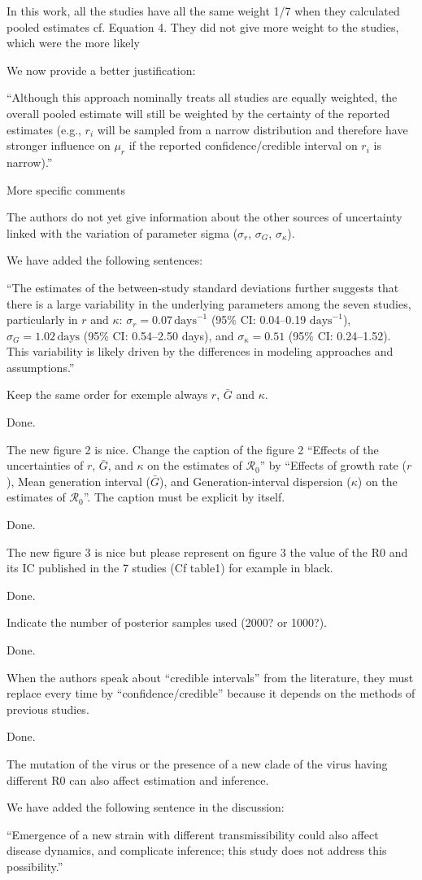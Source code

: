 \documentclass[12pt]{article}
\newcommand{\Ro}{\ensuremath{{\mathcal R}_{0}}\xspace}
\newcommand{\revtext}{\textsf}
\begin{document}
\revtext{In this work, all the studies have all the same weight 1/7 when they calculated pooled estimates
cf. Equation 4. They did not give more weight to the studies, which were the more likely}

We now provide a better justification:

``Although this approach nominally treats all studies are equally weighted, the overall pooled estimate will still be weighted by the certainty of the reported estimates (e.g., $r_i$ will be sampled from a narrow distribution and therefore have stronger influence on $\mu_r$ if the reported confidence/credible interval on $r_i$ is narrow).''

\revtext{More specific comments}

\revtext{The authors do not yet give information about the other sources of uncertainty linked
with the variation of parameter sigma ($\sigma_r$, $\sigma_G$, $\sigma_\kappa$).}

We have added the following sentences:

``The estimates of the between-study standard deviations further suggests that there is a large variability in the underlying parameters among the seven studies, particularly in $r$ and $\kappa$:
$\sigma_r = 0.07\,\textrm{days}^{-1}$ (95\% CI: 0.04--0.19 $\textrm{days}^{-1}$),
$\sigma_G = 1.02\,\textrm{days}$ (95\% CI: 0.54--2.50 days),
and
$\sigma_\kappa = 0.51$ (95\% CI: 0.24--1.52).
This variability is likely driven by the differences in modeling approaches and assumptions.''

\revtext{Keep the same order for exemple always $r$, $\bar G$ and $\kappa$.}

Done.

\revtext{
The new figure 2 is nice. Change the caption of the figure 2 “Effects of the uncertainties of $r$, $\bar G$, and $\kappa$ on the estimates of $\Ro$” by “Effects of growth rate ($r$), Mean generation interval ($\bar G$), and Generation-interval dispersion ($\kappa$) on the estimates of $\Ro$”. The caption must be explicit by itself.
}

Done.

\revtext{
The new figure 3 is nice but please represent on figure 3 the value of the R0
and its IC published in the 7 studies (Cf table1) for example in black.
}

Done.

\revtext{
Indicate the number of posterior samples used (2000? or 1000?).
}

Done.

\revtext{
When the authors speak about “credible intervals” from the literature, they must
replace every time by “confidence/credible” because it depends on the methods
of previous studies.
}

Done.

\revtext{
The mutation of the virus or the presence of a new clade of the virus having
different R0 can also affect estimation and inference.
}

We have added the following sentence in the discussion:

``Emergence of a new strain with different transmissibility could also affect disease dynamics, and complicate inference; this study does not address this possibility.''
\end{document}

